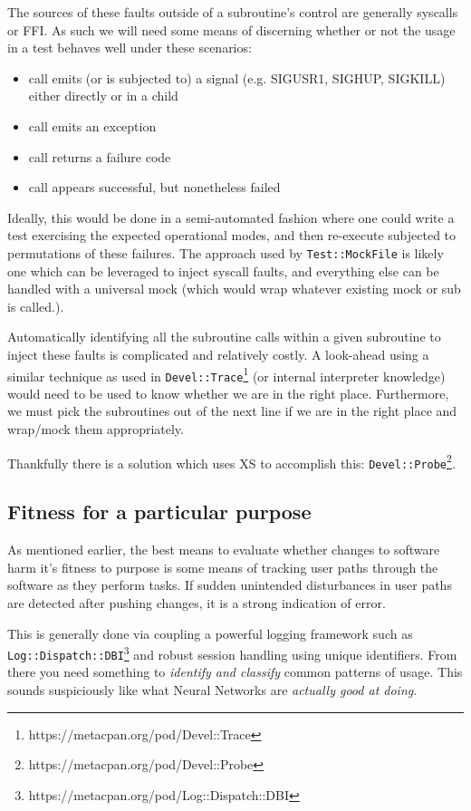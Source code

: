 \documentclass{article}
\begin{document}
The sources of these faults outside of a subroutine's control are generally syscalls or FFI.
As such we will need some means of discerning whether or not the usage in a test behaves well under these scenarios:
\begin{itemize}
\item call emits (or is subjected to) a signal (e.g. SIGUSR1, SIGHUP, SIGKILL) either directly or in a child
\item call emits an exception
\item call returns a failure code
\item call appears successful, but nonetheless failed
\end{itemize}
Ideally, this would be done in a semi-automated fashion where one could write a test exercising the expected operational modes, and then re-execute subjected to permutations of these failures.
The approach used by \texttt{Test::MockFile}\cite{mock} is likely one which can be leveraged to inject syscall faults, and everything else can be handled with a universal mock (which would wrap whatever existing mock or sub is called.).

Automatically identifying all the subroutine calls within a given subroutine to inject these faults is complicated and relatively costly.
A look-ahead using a similar technique as used in \texttt{Devel::Trace}\footnote{https://metacpan.org/pod/Devel::Trace} (or internal interpreter knowledge) would need to be used to know whether we are in the right place.
Furthermore, we must pick the subroutines out of the next line if we are in the right place and wrap/mock them appropriately.

Thankfully there is a solution which uses XS to accomplish this: \texttt{Devel::Probe}\footnote{https://metacpan.org/pod/Devel::Probe}.


\subsection{Fitness for a particular purpose}

As mentioned earlier, the best means to evaluate whether changes to software harm it's fitness to purpose is some means of tracking user paths through the software as they perform tasks.
If sudden unintended disturbances in user paths are detected after pushing changes, it is a strong indication of error.

This is generally done via coupling a powerful logging framework such as \texttt{Log::Dispatch::DBI}\footnote{https://metacpan.org/pod/Log::Dispatch::DBI} and robust session handling using unique identifiers.
From there you need something to \textit{identify and classify} common patterns of usage.
This sounds suspiciously like what Neural Networks are \textit{actually good at doing}.
\end{document}
